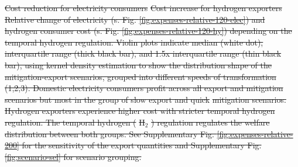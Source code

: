 \documentclass[5p,numafflabel]{elsarticle}
\newcommand{\co}{\ce{CO2}~}
\def\co{CO${}_2${\:}}
\providecommand{\DIFdeltex}[1]{{\protect\color{red}\sout{#1}}}                      %
\providecommand{\DIFdelFL}[1]{\DIFdel{#1}} %
\providecommand{\DIFdel}[1]{\texorpdfstring{\DIFdeltex{#1}}{}} %
\begin{document}
{%
\DIFdelFL{Cost reduction for electricity consumers}}
{%
\DIFdelFL{Cost increase for hydrogen exporters}}
{%
\DIFdelFL{Relative change of electricity (s. Fig. \ref{fig:expenses-relative-120-elec}) and hydrogen consumer cost (s. Fig. \ref{fig:expenses-relative-120-hy}) depending on the temporal hydrogen regulation.     
    Violin plots indicate median (white dot), interquartile range (thick black bar), and 1.5x interquartile range (thin black bar), using kernel density estimation to show the distribution shape of the mitigation-export scenarios, grouped into different speeds of transformation (1,2,3).
    Domestic electricity consumers profit across all export and mitigation scenarios but most in the group of slow export and quick }%
\DIFdelFL{mitigation scenarios. Hydrogen exporters experience higher cost with stricter temporal hydrogen regulation. The temporal hydrogen (}%
\DIFdelFL{H${}_2$}%
\DIFdelFL{) regulation regulates the welfare distribution between both groups. See Supplementary Fig. \ref{fig:expenses-relative-200} for the sensitivity of the export quantities and Supplementary Fig. \ref{fig:scenario-sel} for scenario grouping.}}
\end{document}
